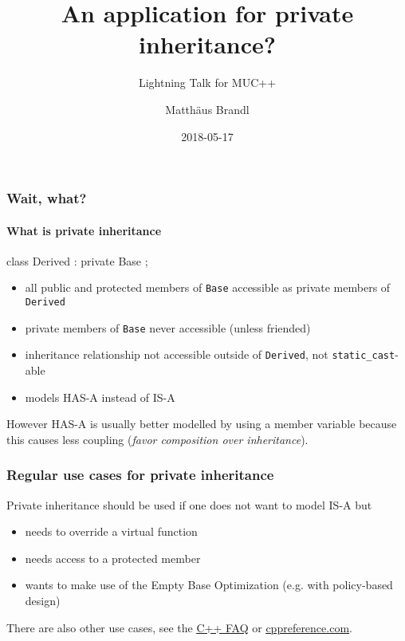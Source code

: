 \documentclass{beamer}
\title{An application for private inheritance?}
\subtitle{Lightning Talk for MUC++}
\author{Matth\"aus Brandl}
\date{2018-05-17}
\def\code#1{\texttt{#1}}
\def\link#1#2{\href{#1}{\usebeamercolor[fg]{structure} \underline{#2}}}
\begin{document}

\frame{\titlepage}


\begin{frame}[fragile]
\frametitle{Wait, what?}
\framesubtitle{What is private inheritance}

\begin{C++}
class Derived : private Base
{};
\end{C++}

\begin{itemize}
\item all public and protected members of \code{Base} accessible as private members of \code{Derived}
\item private members of \code{Base} never accessible (unless friended)
\pause 
\item inheritance relationship not accessible outside of \code{Derived}, not \code{static\_cast}-able
\pause
\item models HAS-A instead of IS-A
\end{itemize}
\pause

However HAS-A is usually better modelled by using a member variable because this causes less coupling (\textit{favor composition over inheritance}).
\end{frame}


\begin{frame}[fragile]
\frametitle{Regular use cases for private inheritance}
Private inheritance should be used if one does not want to model IS-A but
\begin{itemize}
\item needs to override a virtual function
\pause
\item needs access to a protected member
\pause
\item wants to make use of the Empty Base Optimization (e.g. with policy-based design)
\end{itemize}
\pause
There are also other use cases, see the \link{https://isocpp.org/wiki/faq/private-inheritance}{C++ FAQ} or \link{https://en.cppreference.com/w/cpp/language/derived_class\#Private_inheritance}{cppreference.com}.
\end{frame}
\end{document}
